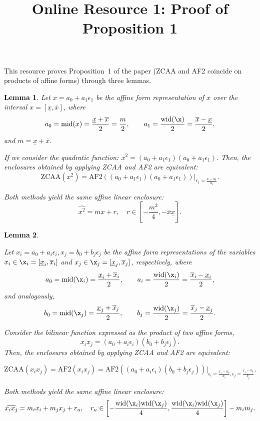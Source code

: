 \documentclass[10pt]{article}
\title{Online Resource 1: Proof of Proposition 1}
\author{}
\date{}
\newtheorem{lem}{Lemma}
\begin{document}
\maketitle
This resource proves Proposition~1 of the paper (ZCAA and AF2 coincide on products of affine forms) through three lemmas.

\begin{lem}
\label{lem:raa-af2-quadratic}
Let $x = a_0 + a_1 \epsilon_1$ be the affine form representation of \(x\) over the interval \(x = [\underline{x}, \overline{x}]\),
where
\[
a_0 = \mathrm{mid}(x) = \frac{\underline{x} + \overline{x}}{2} = \frac{m}{2},
\qquad
a_1 = \frac{\mathrm{wid}(\x)}{2} = \frac{\overline{x} - \underline{x}}{2},
\]
and \(m = \underline{x} + \overline{x}\).

If we consider the quadratic function:
\(
x^2 = (a_0 + a_1 \epsilon_1)(a_0 + a_1 \epsilon_1).
\)
Then, the enclosures obtained by applying ZCAA and AF2 are equivalent:
\[
\mathrm{ZCAA}(x^2)
= \mathrm{AF2}\left((a_0 + a_1 \epsilon_1)(a_0 + a_1 \epsilon_1)\right)
\Big|_{\epsilon_1 = \frac{x - a_0}{a_1}}.
\]

Both methods yield the same affine linear enclosure:
\[
\widehat{x^2} = m x + r, \quad r\in \left[-\frac{m^2}{4}, -\overline{x}\underline{x}\right].
\]

\end{lem}


\begin{lem}
\label{lem:raa-af2-bilinear}

Let
\(
x_i = a_0 + a_i \epsilon_i,
x_j = b_0 + b_j \epsilon_j
\)
be the affine form representations of the variables \(x_i \in \x_i = [\underline{x}_i, \overline{x}_i]\) and
\(x_j \in \x_j = [\underline{x}_j, \overline{x}_j]\), respectively, where
\[
a_0 = \mathrm{mid}(\x_i) = \frac{\underline{x}_i + \overline{x}_i}{2},
\qquad
a_i = \frac{\mathrm{wid}(\x_i)}{2} = \frac{\overline{x}_i - \underline{x}_i}{2},
\]
and analogously,
\[
b_0 = \mathrm{mid}(\x_j) = \frac{\underline{x}_j + \overline{x}_j}{2},
\qquad
b_j = \frac{\mathrm{wid}(\x_j)}{2} = \frac{\overline{x}_j - \underline{x}_j}{2}.
\]

Consider the bilinear function expressed as the product of two affine forms,
\[
x_i x_j = (a_0 + a_i \epsilon_i)(b_0 + b_j \epsilon_j).
\]
Then, the enclosures obtained by applying ZCAA and AF2 are equivalent:

\[
\mathrm{ZCAA}(x_i x_j)
= \mathrm{AF2}(x_i x_j) = \mathrm{AF2}\left((a_0 + a_i \epsilon_i)(b_0 + b_j \epsilon_j)\right)
\Big|_{\epsilon_i = \frac{x_i - a_0}{a_i}, \epsilon_j = \frac{x_j - b_0}{b_j}}.
\]

Both methods yield the same affine linear enclosure:
\[
\widehat{x_i x_j} = m_i x_i + m_j x_j + r_u, \quad r_u \in
 \left[
  -\frac{\mathrm{wid}(\x_i)\mathrm{wid}(\x_j)}{4},
  \frac{\mathrm{wid}(\x_i)\mathrm{wid}(\x_j)}{4}
  \right]- m_i m_j.
  \]


\end{lem}
\end{document}
